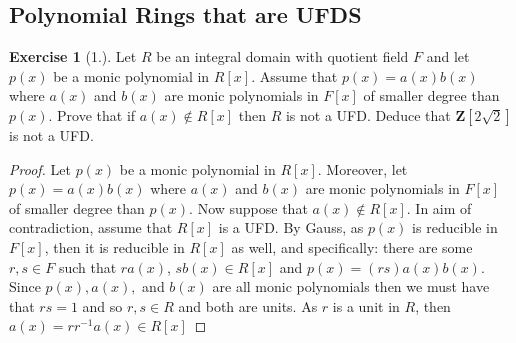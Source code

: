\documentclass[9pt,reqno]{amsart}
\theoremstyle{definition}
\newtheorem{exercise}{Exercise}[section]
\newcommand{\zz}{\mathbf Z}
\begin{document}
\subsection{Polynomial Rings that are UFDS}
\begin{exercise}[1.] Let $R$ be an integral domain with quotient field $F$ and let $p(x)$ be a monic polynomial in $R[x]$. Assume that $p(x) = a(x) b(x)$ where $a(x)$ and $b(x)$ are monic polynomials in $F[x]$ of smaller degree than $p(x)$. Prove that if $a(x) \notin R[x]$ then $R$ is not a UFD. Deduce that $\zz[2 \sqrt{2} ]$ is not a UFD.
\end{exercise}
\begin{proof}
Let $p(x)$ be a monic polynomial in $R[x]$. Moreover, let $p(x) = a(x) b (x)$ where $a(x)$ and $b(x)$ are monic polynomials in $F[x]$ of smaller degree than $p(x)$. Now suppose that $a(x) \notin  R[x]$. In aim of contradiction, assume that $R[x]$ is a UFD. By Gauss, as $p(x)$ is reducible in $F[x]$, then it is reducible in $R[x]$ as well, and specifically: there are some $r, s \in F$ such that $r a(x)$, $sb(x) \in R[x]$ and $p(x) = (rs)a(x)b(x)$. Since $p(x), a(x),$ and $b(x)$ are all monic polynomials then we must have that $rs =1$ and so $r, s \in R$ and both are units. As $r$ is a unit in $R$, then $a(x) = r r^{-1} a(x) \in R[x]$
\end{proof}
\end{document}
